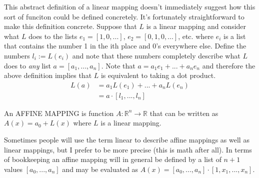 This abstract definition of a linear mapping doesn't immediately suggest how this sort of funciton could be defined concretely. It's fortunately straightforward to make this definition concrete. Suppose that $L$ is a linear mapping and consider what $L$ does to the lists $e_1=[1,0,...]$, $e_2=[0,1,0,...]$, etc. where $e_i$ is a list that contains the number 1 in the ith place and 0's everywhere else. Define the numbers $l_i:=L(e_i)$ and note that these numbers completely describe what $L$ does to \emph{any} list $a=[a_1,...,a_n]$. Note that $a=a_1e_1+...+a_ne_n$ and therefore the above definition implies that $L$ is equivalent to taking a dot product.
\begin{align*}
	L(a)&=a_1L(e_1)+...+a_nL(e_n)\\
	&=a\cdot[l_1,...,l_n]
\end{align*}

\begin{definition}

An AFFINE MAPPING is function $A:\mathbb{R}^n\to\mathbb{R}$ that can be written as $A(x)=a_0+L(x)$ where $L$ is a linear mapping.
\end{definition}

Sometimes people will use the term linear to describe affine mappings as well as linear mappings, but I prefer to be more precise (this is math after all). In terms of bookkeeping an affine mapping will in general be defined by a list of $n+1$ values $[a_0,...,a_n]$ and may be evaluated as $A(x)=[a_0,...,a_n]\cdot[1,x_1,...,x_n]$.
